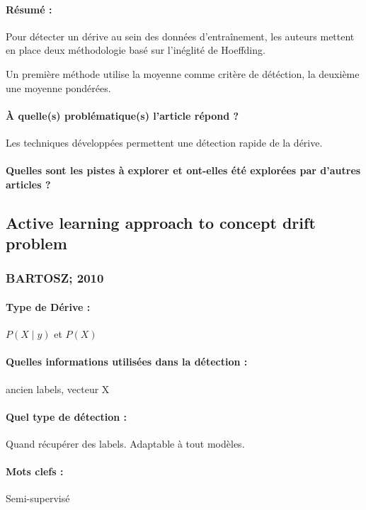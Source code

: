 \documentclass[11pt,a4paper]{report}
\begin{document}
\paragraph{Résumé :} Pour détecter un dérive au sein des données d'entraînement, les auteurs mettent en place deux méthodologie basé sur l'inéglité de Hoeffding.

Un première méthode utilise la moyenne comme critère de détéction, la deuxième une moyenne pondérées.

\paragraph{À quelle(s) problématique(s) l'article répond ?} Les techniques développées permettent une détection rapide de la dérive. 

\paragraph{Quelles sont les pistes à explorer et ont-elles  été explorées par d'autres articles ?}







\subsection{Active learning approach to concept drift problem}
\subsubsection{BARTOSZ; 2010}

\paragraph{Type de Dérive :} $P(X\mid y)$ et $P(X)$
\paragraph{Quelles informations utilisées dans la détection :} ancien labels, vecteur X
\paragraph{Quel type de détection :} Quand récupérer des labels. Adaptable à tout modèles.

\paragraph{Mots clefs :} Semi-supervisé
\end{document}
